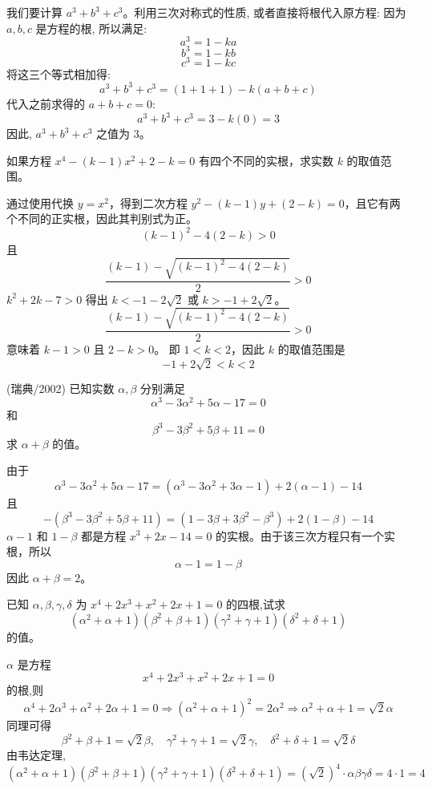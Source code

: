 \begin{questions}
\begin{solution}
我们要计算 $a^3 + b^3 + c^3$。利用三次对称式的性质, 或者直接将根代入原方程:
因为 $a, b, c$ 是方程的根, 所以满足:
\[
a^3 = 1 - ka
\]
\[
b^3 = 1 - kb
\]
\[
c^3 = 1 - kc
\]
将这三个等式相加得:
\[
a^3 + b^3 + c^3 = (1 + 1 + 1) - k(a + b + c)
\]
代入之前求得的 $a + b + c = 0$:
\[
a^3 + b^3 + c^3 = 3 - k(0) = 3
\]
因此, $a^3 + b^3 + c^3$ 之值为 3。
\end{solution}

\question 如果方程 $x^4 - (k - 1)x^2 + 2 - k = 0$ 有四个不同的实根，求实数 $k$ 的取值范围。

\begin{solution}
通过使用代换 $y = x^2$，得到二次方程 $y^2 - (k - 1)y + (2 - k) = 0$，且它有两个不同的正实根，因此其判别式为正。
\[
(k - 1)^2 - 4(2 - k) > 0
\]
且
\[
\frac{(k - 1) - \sqrt{(k - 1)^2 - 4(2 - k)}}{2} > 0
\]
$k^2 + 2k - 7 > 0$ 得出 $k < -1 - 2\sqrt{2}$ 或 $k > -1 + 2\sqrt{2}$。
\[
\frac{(k - 1) - \sqrt{(k - 1)^2 - 4(2 - k)}}{2} > 0
\]
意味着 $k - 1 > 0$ 且 $2 - k > 0$。
即 $1 < k < 2$，因此 $k$ 的取值范围是
\[
-1 + 2\sqrt{2} < k < 2
\]
\end{solution}

\question (瑞典/2002) 已知实数 $\alpha, \beta$ 分别满足
\[
\alpha^3 - 3\alpha^2 + 5\alpha - 17 = 0
\]
和
\[
\beta^3 - 3\beta^2 + 5\beta + 11 = 0
\]
求 $\alpha + \beta$ 的值。

\begin{solution}
由于
\[
\alpha^3 - 3\alpha^2 + 5\alpha - 17 = (\alpha^3 - 3\alpha^2 + 3\alpha - 1) + 2(\alpha - 1) - 14
\]
且
\[
-(\beta^3 - 3\beta^2 + 5\beta + 11) = (1 - 3\beta + 3\beta^2 - \beta^3) + 2(1 - \beta) - 14
\]
$\alpha - 1$ 和 $1 - \beta$ 都是方程 $x^3 + 2x - 14 = 0$ 的实根。由于该三次方程只有一个实根，所以
\[
\alpha - 1 = 1 - \beta
\]
因此 $\alpha + \beta = 2$。
\end{solution}
        
    \question 已知 $\alpha,\beta,\gamma,\delta$ 为 $x^{4}+2x^{3}+x^{2}+2x+1=0$ 的四根,试求 $$(\alpha^{2}+\alpha+1)(\beta^{2}+\beta+1)(\gamma^{2}+\gamma+1)(\delta^{2}+\delta+1)$$ 的值。
    \begin{solution}
        $\alpha$ 是方程
        $$x^{4}+2x^{3}+x^{2}+2x+1=0$$
        的根,则
        \[
        \alpha^4 + 2\alpha^3 + \alpha^2 + 2\alpha + 1 = 0
        \Rightarrow (\alpha^2 + \alpha + 1)^2 = 2\alpha^2
        \Rightarrow \alpha^2 + \alpha + 1 = \sqrt{2} \alpha
        \]
        同理可得
        \[
        \beta^2 + \beta + 1 = \sqrt{2} \beta,\quad
        \gamma^2 + \gamma + 1 = \sqrt{2} \gamma,\quad
        \delta^2 + \delta + 1 = \sqrt{2} \delta
        \]
        由韦达定理,
        \[
        (\alpha^2 + \alpha + 1)(\beta^2 + \beta + 1)(\gamma^2 + \gamma + 1)(\delta^2 + \delta + 1)
        = (\sqrt{2})^4 \cdot \alpha \beta \gamma \delta =4 \cdot 1 = 4
        \]
    \end{solution}


\end{questions}
